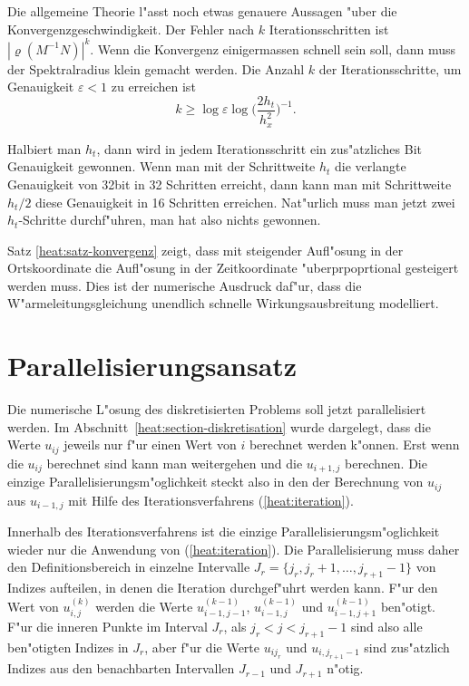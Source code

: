 Die allgemeine Theorie l"asst noch etwas genauere Aussagen "uber die
Konvergenzgeschwindigkeit.
Der Fehler nach $k$ Iterationsschritten ist $|\varrho(M^{-1}N)|^k$.
Wenn die Konvergenz einigermassen schnell sein soll, dann muss
der Spektralradius klein gemacht werden.
Die Anzahl $k$ der Iterationsschritte, um Genauigkeit $\varepsilon< 1$ zu
erreichen ist
\[
k\ge
\log\varepsilon
\log\biggl(\frac{2h_t}{h_x^2}\biggr)^{-1}.
\]

Halbiert man $h_t$, dann wird in jedem Iterationsschritt ein zus"atzliches
Bit Genauigkeit gewonnen.
Wenn man mit der Schrittweite $h_t$ die verlangte Genauigkeit
von 32bit in 32 Schritten erreicht, dann kann man mit
Schrittweite $h_t/2$ diese Genauigkeit in 16 Schritten erreichen.
Nat"urlich muss man jetzt
zwei $h_t$-Schritte durchf"uhren, man hat also nichts gewonnen.

Satz \ref{heat:satz-konvergenz} zeigt, dass mit steigender Aufl"osung
in der Ortskoordinate die Aufl"osung in der Zeitkoordinate "uberprpoprtional
gesteigert werden muss.
Dies ist der numerische Ausdruck daf"ur, dass die W"armeleitungsgleichung
unendlich schnelle Wirkungsausbreitung modelliert.

\section{Parallelisierungsansatz}
Die numerische L"osung des diskretisierten Problems soll jetzt parallelisiert
werden.
Im Abschnitt~\ref{heat:section-diskretisation} wurde dargelegt, dass 
die Werte $u_{ij}$ jeweils nur f"ur einen Wert von $i$ berechnet
werden k"onnen.
Erst wenn die $u_{ij}$ berechnet sind kann man weitergehen und die
$u_{i+1,j}$ berechnen.
Die einzige Parallelisierungsm"oglichkeit steckt also in den der Berechnung
von $u_{ij}$ aus $u_{i-1,j}$ mit Hilfe des Iterationsverfahrens
(\ref{heat:iteration}).

Innerhalb des Iterationsverfahrens ist die einzige
Parallelisierungsm"oglichkeit wieder nur die Anwendung von
(\ref{heat:iteration}).
Die Parallelisierung muss daher den Definitionsbereich in einzelne
Intervalle $J_r=\{j_r,j_r+1,\dots,j_{r+1}-1\}$ von Indizes aufteilen,
in denen die Iteration durchgef"uhrt werden kann. 
F"ur den Wert von $u_{i,j}^{(k)}$ werden die Werte
$u_{i-1,j-1}^{(k-1)}$, $u_{i-1,j}^{(k-1)}$ und $u_{i-1,j+1}^{(k-1)}$ ben"otigt. 
F"ur die inneren Punkte im Interval $J_r$, als $j_r < j < j_{r+1}-1$
sind also alle ben"otigten Indizes in $J_r$, aber f"ur die
Werte $u_{ij_r}$ und $u_{i,j_{r+1}-1}$ sind zus"atzlich Indizes
aus den benachbarten Intervallen $J_{r-1}$ und $J_{r+1}$ n"otig.

